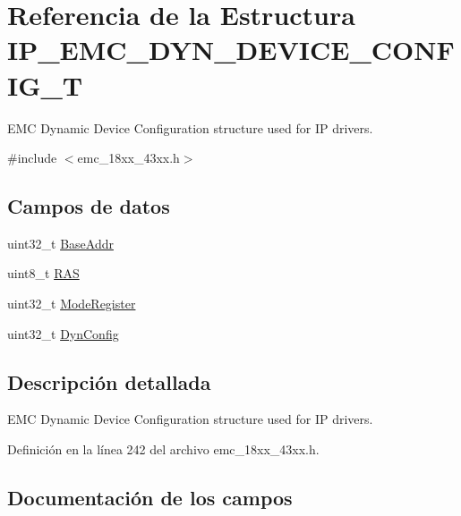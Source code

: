 \hypertarget{struct_i_p___e_m_c___d_y_n___d_e_v_i_c_e___c_o_n_f_i_g___t}{}\section{Referencia de la Estructura I\+P\+\_\+\+E\+M\+C\+\_\+\+D\+Y\+N\+\_\+\+D\+E\+V\+I\+C\+E\+\_\+\+C\+O\+N\+F\+I\+G\+\_\+T}
\label{struct_i_p___e_m_c___d_y_n___d_e_v_i_c_e___c_o_n_f_i_g___t}


E\+MC Dynamic Device Configuration structure used for IP drivers.  




{\ttfamily \#include $<$emc\+\_\+18xx\+\_\+43xx.\+h$>$}

\subsection*{Campos de datos}
\begin{DoxyCompactItemize}
\item 
uint32\+\_\+t \hyperlink{struct_i_p___e_m_c___d_y_n___d_e_v_i_c_e___c_o_n_f_i_g___t_adf081f84496165c1cfcf4953f668f07a}{Base\+Addr}
\item 
uint8\+\_\+t \hyperlink{struct_i_p___e_m_c___d_y_n___d_e_v_i_c_e___c_o_n_f_i_g___t_a72f5ca1c6016aa932675504a46235f6e}{R\+AS}
\item 
uint32\+\_\+t \hyperlink{struct_i_p___e_m_c___d_y_n___d_e_v_i_c_e___c_o_n_f_i_g___t_acca66c64c7b5806d9c62078fa6702021}{Mode\+Register}
\item 
uint32\+\_\+t \hyperlink{struct_i_p___e_m_c___d_y_n___d_e_v_i_c_e___c_o_n_f_i_g___t_a5960a73b3f9e123ddd508c250f77d984}{Dyn\+Config}
\end{DoxyCompactItemize}


\subsection{Descripción detallada}
E\+MC Dynamic Device Configuration structure used for IP drivers. 

Definición en la línea 242 del archivo emc\+\_\+18xx\+\_\+43xx.\+h.



\subsection{Documentación de los campos}
